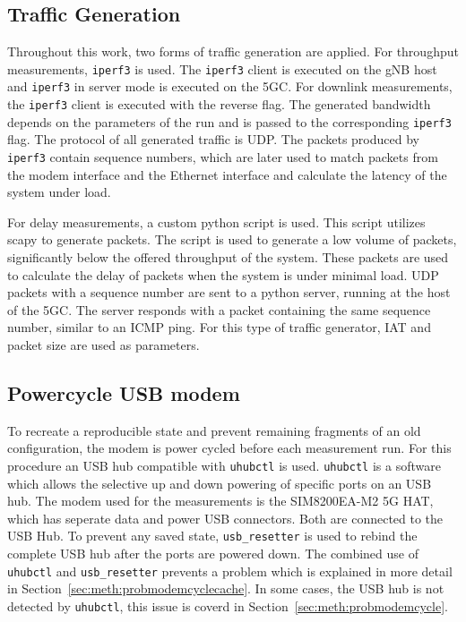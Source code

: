 \subsection{Traffic Generation}\label{sec:meth:trafficgen}

Throughout this work, two forms of traffic generation are applied.
For throughput measurements, \texttt{iperf3} is used.
The \texttt{iperf3} client is executed on the \gls{gNB} host and \texttt{iperf3} in server mode is executed on
the \gls{5GC}. For downlink measurements, the \texttt{iperf3} client is executed with the reverse flag.
The generated bandwidth depends on the parameters of the run and is passed to the corresponding \texttt{iperf3} flag.
The protocol of all generated traffic is UDP.
The packets produced by \texttt{iperf3} contain sequence numbers, which are later used to match packets from
the modem interface and the Ethernet interface and calculate the latency of the system under load.

For delay measurements, a custom python script is used.
This script utilizes scapy to generate packets.
The script is used to generate a low volume of packets, significantly below the offered throughput of the system.
These packets are used to calculate the delay of packets when the system is under minimal load.
UDP packets with a sequence number are sent to a python server, running at the host of the \gls{5GC}.
The server responds with a packet containing the same sequence number, similar to an ICMP ping.
For this type of traffic generator, \gls{IAT} and packet size are used as parameters.


\subsection{Powercycle USB modem}\label{sec:meth:modemcycle}
To recreate a reproducible state and prevent remaining fragments of an old configuration, the modem is power cycled before each measurement run.
For this procedure an USB hub compatible with \texttt{uhubctl}\cite{uhubctl} is used.
\texttt{uhubctl} is a software which allows the selective up and down powering of specific ports on an USB hub.
The modem used for the measurements is the SIM8200EA-M2 5G HAT, which has seperate data and power USB connectors.
Both are connected to the USB Hub.
To prevent any saved state, \texttt{usb\_resetter}\cite{usbresetter} is used to rebind the complete USB hub
after the ports are powered down.
The combined use of \texttt{uhubctl} and \texttt{usb\_resetter} prevents a problem which is explained in more
detail in Section~\ref{sec:meth:probmodemcyclecache}.
In some cases, the USB hub is not detected by \texttt{uhubctl}, this issue is coverd in
Section~\ref{sec:meth:probmodemcycle}.



